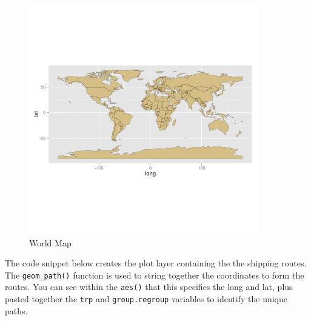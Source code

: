 \documentclass[]{article}
\newenvironment{Shaded}{}{}
\newcommand{\KeywordTok}[1]{\textcolor[rgb]{0.00,0.44,0.13}{\textbf{{#1}}}}
\newcommand{\DataTypeTok}[1]{\textcolor[rgb]{0.56,0.13,0.00}{{#1}}}
\newcommand{\FloatTok}[1]{\textcolor[rgb]{0.25,0.63,0.44}{{#1}}}
\newcommand{\StringTok}[1]{\textcolor[rgb]{0.25,0.44,0.63}{{#1}}}
\newcommand{\NormalTok}[1]{{#1}}
\let\Oldincludegraphics\includegraphics
\renewcommand{\includegraphics}[1]{\Oldincludegraphics[width=10cm]{#1}}
\begin{document}
\begin{figure}[htbp]
\centering
\includegraphics{figure/World_Map.png}
\caption{World Map}
\end{figure}

The code snippet below creates the plot layer containing the the
shipping routes. The \texttt{geom\_path()} function is used to string
together the coordinates to form the routes. You can see within the
\texttt{aes()} that this specifies the long and lat, plus pasted
together the \texttt{trp} and \texttt{group.regroup} variables to
identify the unique paths.

\begin{Shaded}
\end{Shaded}
\end{document}
